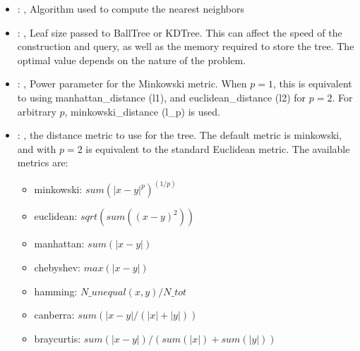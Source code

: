 \begin{itemize}
    \item {}: , 
      Algorithm used to compute the nearest neighbors

    \item {}: , 
      Leaf size passed to BallTree or KDTree. This can affect the speed of the construction
      and query, as well as the memory required to store the tree. The optimal value depends on the
      nature of the problem.

    \item {}: , 
      Power parameter for the Minkowski metric. When $p = 1$, this is equivalent to using
      manhattan\_distance (l1), and euclidean\_distance (l2) for $p = 2$. For arbitrary $p$,
      minkowski\_distance                                                  (l\_p) is used.

    \item {}: , 
      the distance metric to use for the tree. The default metric is minkowski, and with
      $p=2$ is equivalent to the standard Euclidean metric.
      The available metrics are:                                                  \begin{itemize}
      \item minkowski: $sum(|x - y|^p)^(1/p)$
      \item euclidean: $sqrt(sum((x - y)^2))$
      \item manhattan: $sum(|x - y|)$                                                    \item
      chebyshev: $max(|x - y|)$                                                    \item hamming:
      $N\_unequal(x, y) / N\_tot$                                                    \item canberra:
      $sum(|x - y| / (|x| + |y|))$                                                    \item
      braycurtis: $sum(|x - y|) / (sum(|x|) + sum(|y|))$
      \end{itemize}
  \end{itemize}


